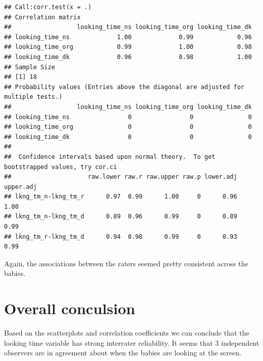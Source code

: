 \documentclass[
]{book}
\newenvironment{Shaded}{\begin{snugshade}}{\end{snugshade}}
\newcommand{\DataTypeTok}[1]{\textcolor[rgb]{0.13,0.29,0.53}{#1}}
\newcommand{\KeywordTok}[1]{\textcolor[rgb]{0.13,0.29,0.53}{\textbf{#1}}}
\newcommand{\NormalTok}[1]{#1}
\newcommand{\OperatorTok}[1]{\textcolor[rgb]{0.81,0.36,0.00}{\textbf{#1}}}
\newcommand{\OtherTok}[1]{\textcolor[rgb]{0.56,0.35,0.01}{#1}}
\newcommand{\StringTok}[1]{\textcolor[rgb]{0.31,0.60,0.02}{#1}}
\begin{document}
\begin{Shaded}
\end{Shaded}

\begin{verbatim}
## Call:corr.test(x = .)
## Correlation matrix 
##                  looking_time_ns looking_time_org looking_time_dk
## looking_time_ns             1.00             0.99            0.96
## looking_time_org            0.99             1.00            0.98
## looking_time_dk             0.96             0.98            1.00
## Sample Size 
## [1] 18
## Probability values (Entries above the diagonal are adjusted for multiple tests.) 
##                  looking_time_ns looking_time_org looking_time_dk
## looking_time_ns                0                0               0
## looking_time_org               0                0               0
## looking_time_dk                0                0               0
## 
##  Confidence intervals based upon normal theory.  To get bootstrapped values, try cor.ci
##                     raw.lower raw.r raw.upper raw.p lower.adj upper.adj
## lkng_tm_n-lkng_tm_r      0.97  0.99      1.00     0      0.96      1.00
## lkng_tm_n-lkng_tm_d      0.89  0.96      0.99     0      0.89      0.99
## lkng_tm_r-lkng_tm_d      0.94  0.98      0.99     0      0.93      0.99
\end{verbatim}

Again, the associations between the raters seemed pretty consistent across the babies.

\hypertarget{overall-conculsion}{%
\section{Overall conculsion}\label{overall-conculsion}}

Based on the scatterplots and correlation coefficients we can conclude that the looking time variable has strong interrater reliability. It seems that 3 independent observers are in agreement about when the babies are looking at the screen.

  
\end{document}
